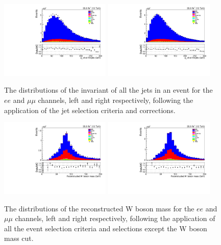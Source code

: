 \begin{figure}[htbp]
\centering
\includegraphics[width=0.47\textwidth]{figs/background-estimation/plots/unblinded/prompt_ee_ttbarInc/totalJetPt_NPL_ee_jetSel_ee.pdf}
\includegraphics[width=0.47\textwidth]{figs/background-estimation/plots/unblinded/prompt_mumu_ttbarInc/totalJetPt_NPL_mumu_jetSel_mumu.pdf}
\caption{
The distributions of the invariant \pT of all the jets in an event for the $ee$ and $\mu\mu$ channels, left and right respectively, following the application of the jet selection criteria and corrections.
}
\label{fig:SR_totJetPt}
\end{figure}

\begin{figure}[htbp]
\centering
\includegraphics[width=0.47\textwidth]{figs/background-estimation/plots/unblinded/prompt_ee_ttbarInc/wPairMass_NPL_ee_bTag_ee.pdf}
\includegraphics[width=0.47\textwidth]{figs/background-estimation/plots/unblinded/prompt_mumu_ttbarInc/wPairMass_NPL_mumu_bTag_mumu.pdf}
\caption{
The distributions of the reconstructed W boson mass for the $ee$ and $\mu\mu$ channels, left and right respectively, following the application of all the event selection criteria and selections except the W boson mass cut.
}
\label{fig:SR_wBoson}
\end{figure}


